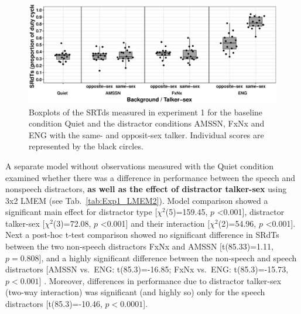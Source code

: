 \documentclass[a4paper, twoside]{templates/ociamthesis}
\begin{document}
\begin{figure}[ht]
\center
\includegraphics[width=\textwidth]{figures/Chapt1/dcBoxplot_Exp1_2020-04-06.eps}
\caption{\label{fig:Exp1BoxPlot}{Boxplots of the SRTds measured in experiment 1 for the baseline condition Quiet and the distractor conditions AMSSN, FxNx and ENG with the same- and opposit-sex talker. Individual scores are represented by the black circles.}}
\end{figure}

A separate model without observations measured with the Quiet condition examined whether there was a difference in performance between the speech and nonspeech distractors, \textbf{as well as the effect of distractor talker-sex} using 3x2 LMEM (see Tab.~\ref{tab:Exp1_LMEM2}). Model comparison showed a significant main effect for distractor type {[}\(\chi^{2}\)(5)=159.45, \(p\) \textless 0.001{]}, distractor talker-sex {[}\(\chi^{2}\)(3)=72.08, \(p\) \textless 0.001{]} and their interaction {[}\(\chi^{2}\)(2)=54.96, \(p\) \textless 0.001{]}.
Next a post-hoc t-test comparison showed no significant difference in SRdTs between the two non-speech distractors FxNx and AMSSN {[}t(85.33)=1.11, \(p=0.808\){]}, and a highly significant difference between the non-speech and speech distractors {[}AMSSN vs.~ENG: t(85.3)=-16.85; FxNx vs.~ENG: t(85.3)=-15.73, \(p<0.001\){]} . Moreover, differences in performance due to distractor talker-sex (two-way interaction) was significant (and highly so) only for the speech distractors {[}t(85.3)=-10.46, \(p<0.0001\){]}.\\
\end{document}
